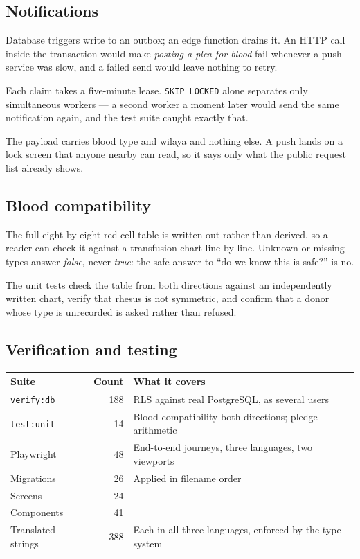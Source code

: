 \documentclass[11pt,a4paper]{article}
\begin{document}
\subsection{Notifications}

Database triggers write to an outbox; an edge function drains it. An HTTP call
inside the transaction would make \emph{posting a plea for blood} fail whenever
a push service was slow, and a failed send would leave nothing to retry.

Each claim takes a five-minute lease. \texttt{SKIP LOCKED} alone separates only
simultaneous workers — a second worker a moment later would send the same
notification again, and the test suite caught exactly that.

The payload carries blood type and wilaya and nothing else. A push lands on a
lock screen that anyone nearby can read, so it says only what the public request
list already shows.

\subsection{Blood compatibility}

The full eight-by-eight red-cell table is written out rather than derived, so a
reader can check it against a transfusion chart line by line. Unknown or missing
types answer \emph{false}, never \emph{true}: the safe answer to ``do we know
this is safe?'' is no.

The unit tests check the table from both directions against an independently
written chart, verify that rhesus is not symmetric, and confirm that a donor
whose type is unrecorded is asked rather than refused.

\subsection{Verification and testing}

\begin{center}
\begin{tabularx}{\textwidth}{@{}lrX@{}}
\toprule
\textbf{Suite} & \textbf{Count} & \textbf{What it covers} \\
\midrule
\texttt{verify:db} & 188 & RLS against real PostgreSQL, as several users \\
\texttt{test:unit} & 14 & Blood compatibility both directions; pledge arithmetic \\
Playwright & 48 & End-to-end journeys, three languages, two viewports \\
\midrule
Migrations & 26 & Applied in filename order \\
Screens & 24 & \\
Components & 41 & \\
Translated strings & 388 & Each in all three languages, enforced by the type system \\
\bottomrule
\end{tabularx}
\end{center}
\end{document}
